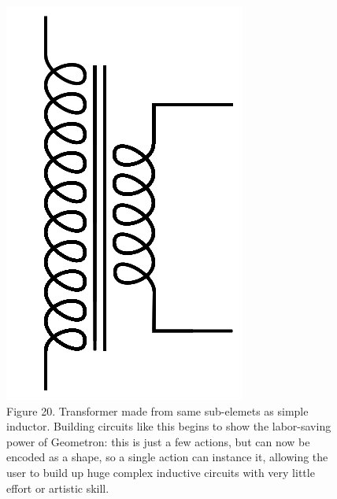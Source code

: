 \documentclass[11pt]{article}
\begin{document}
\begin{figure}

\includegraphics[width=\linewidth]{figures/figure20_transformer.png}

\caption{Figure 20. Transformer made from same sub-elemets as simple inductor.  Building circuits like this begins to show the labor-saving power of Geometron: this is just a few actions, but can now be encoded as a shape, so a single action can instance it, allowing the user to build up huge complex inductive circuits with very little effort or artistic skill. }
\end{figure}
\end{document}
